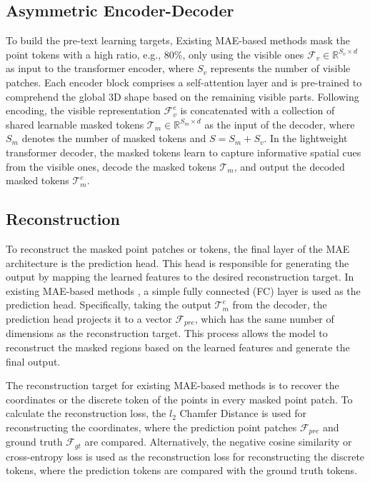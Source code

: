 \documentclass[sigconf, screen]{acmart}
\begin{document}
\subsection{Asymmetric Encoder-Decoder}
To build the pre-text learning targets, Existing MAE-based methods \cite{pang2022masked, dong2022autoencoders, zhang2022learning} mask the point tokens with a high ratio, e.g., 80\%,  only using the visible ones $\mathcal{F}_{v}\in \mathbb R^{S_{v}\times d}$ as input to the transformer encoder, where $S_{v}$ represents the number of visible patches. Each encoder block comprises a self-attention layer and is pre-trained to comprehend the global 3D shape based on the remaining visible parts. Following encoding, the visible representation $\mathcal{F}_{v}^e$ is concatenated with a collection of shared learnable masked tokens $\mathcal{T}_{m}\in\mathbb R^{S_{m}\times d}$ as the input of the decoder, where $S_{m}$ denotes the number of masked tokens and $S = S_{m} + S_{v}$. In the lightweight transformer decoder, the masked tokens learn to capture informative spatial cues from the visible ones, decode the masked tokens $\mathcal{T}_{m}$, and output the decoded masked tokens $\mathcal{T}_{m}^e$.
  
\subsection{Reconstruction}

To reconstruct the masked point patches or tokens, the final layer of the MAE architecture is the prediction head. This head is responsible for generating the output by mapping the learned features to the desired reconstruction target. In existing MAE-based methods \cite{pang2022masked, dong2022autoencoders}, a simple fully connected (FC) layer is used as the prediction head. Specifically, taking the output $\mathcal{T}_{m}^e$ from the decoder, the prediction head projects it to a vector $\mathcal{F}_{pre}$, which has the same number of dimensions as the reconstruction target. This process allows the model to reconstruct the masked regions based on the learned features and generate the final output.



The reconstruction target for existing MAE-based methods is to recover the coordinates \cite{pang2022masked} or the discrete token \cite{dong2022autoencoders} of the points in every masked point patch.
To calculate the reconstruction loss, the $l_2$ Chamfer Distance \cite{fan2017point} is used for reconstructing the coordinates, where the prediction point patches $\mathcal{F}_{pre}$ and ground truth $\mathcal{F}_{gt}$ are compared. Alternatively, the negative cosine similarity \cite{dong2022autoencoders} or cross-entropy loss \cite{yu2022point} is used as the reconstruction loss for reconstructing the discrete tokens, where the prediction tokens are compared with the ground truth tokens.
\end{document}
